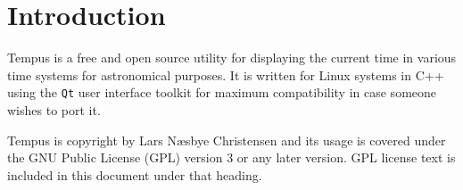 \section{Introduction}
Tempus is a free and open source utility for displaying the current time in various time systems for astronomical purposes. It is written for Linux systems in C++ using the \texttt{Qt} user interface toolkit for maximum compatibility in case someone wishes to port it.

Tempus is copyright by Lars N{\ae}sbye Christensen and its usage is covered under the GNU Public License (GPL) version 3 or any later version. GPL license text is included in this document under that heading.

